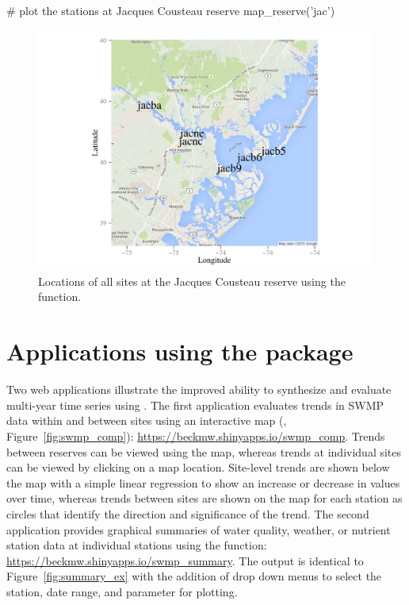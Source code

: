 \begin{example}
# plot the stations at Jacques Cousteau reserve
map_reserve('jac')
\end{example}
\begin{figure}[!h]

{\centering \includegraphics[width=\textwidth]{map_ex-1} 

}

\caption[Locations of all sites at the Jacques Cousteau reserve using the  function]{Locations of all sites at the Jacques Cousteau reserve using the  function.}\label{fig:map_ex}
\end{figure}

\section{Applications using the  package}
\label{swmp_apps}

Two  web applications illustrate the improved ability to synthesize and evaluate multi-year time series using .  The first application evaluates trends in SWMP data within and between sites using an interactive  map (\citet{Cheng15}, Figure~\ref{fig:swmp_comp}): \href{https://beckmw.shinyapps.io/swmp_comp}{https://beckmw.shinyapps.io/swmp\_comp}.  Trends between reserves can be viewed using the map, whereas trends at individual sites can be viewed by clicking on a map location.  Site-level trends are shown below the map with a simple linear regression to show an increase or decrease in values over time, whereas trends between sites are shown on the map for each station as circles that identify the direction and significance of the trend.  The second application provides graphical summaries of water quality, weather, or nutrient station data at individual stations using the  function: \href{https://beckmw.shinyapps.io/swmp_summary/}{https://beckmw.shinyapps.io/swmp\_summary}.  The output is identical to Figure~\ref{fig:summary_ex} with the addition of drop down menus to select the station, date range, and parameter for plotting.

